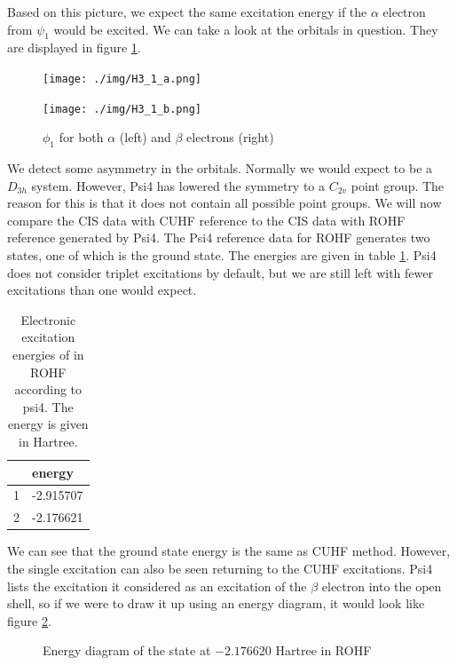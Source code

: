 Based on this picture, we expect the same excitation energy if the $\alpha$ electron from $\psi_1$ would be excited. We can take a look at the orbitals in question.
They are displayed in figure \ref{fig:1_cuhf}.
\begin{figure}[H]
  \begin{minipage}[b]{0.5\linewidth}
  \texttt{[image: ./img/H3\_1\_a.png]}
  \end{minipage}
  \begin{minipage}[b]{0.5\linewidth}
    \texttt{[image: ./img/H3\_1\_b.png]}
  \end{minipage}
  
  \caption{$\phi_1$ for both $\alpha$ (left) and $\beta$ electrons (right)}
  \label{fig:1_cuhf}
\end{figure}
We detect some asymmetry in the orbitals. Normally we would expect  to be a $D_{3h}$ system. However, Psi4 has lowered the symmetry to a $C_{2v}$
point group. The reason for this is that it does not contain all possible point groups.
We will now compare the CIS data with CUHF reference to the CIS data with ROHF reference generated by Psi4.
The Psi4 reference data for ROHF generates two states, one of which is the ground state. The energies are given in table \ref{tab:ROHF}. Psi4 does not consider triplet excitations by
default, but we are still left with fewer excitations than one would expect.
\begin{table}[H]
  \caption{Electronic excitation energies of  in ROHF according to psi4. The energy is given in Hartree.}
  \label{tab:ROHF}
  \begin{tabular}{l|l}
      & energy    \\
    \hline
    1 & -2.915707 \\
    2 & -2.176621
  \end{tabular}
\end{table}
We can see that the ground state energy is the same as CUHF method. However, the single excitation can also be seen returning to the CUHF excitations. Psi4 lists the excitation it
considered as an excitation of the $\beta$ electron into the open shell, so if we were to draw it up using an energy diagram, it would look like figure \ref{fig:energydiag3}.
\begin{figure}[H]
  \begin{center}
  \end{center}
  \caption{Energy diagram of the state at $-2.176620$ Hartree in ROHF}
  \label{fig:energydiag3}
\end{figure}
